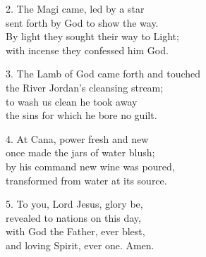 
2. The Magi came, led by a star\\
sent forth by God to show the way.\\
By light they sought their way to Light;\\
with incense they confessed him God.

3. The Lamb of God came forth and touched\\
the River Jordan's cleansing stream;\\
to wash us clean he took away\\
the sins for which he bore no guilt.

4. At Cana, power fresh and new\\
once made the jars of water blush;\\
by his command new wine was poured,\\
transformed from water at its source.

5. To you, Lord Jesus, glory be,\\
revealed to nations on this day,\\
with God the Father, ever blest,\\
and loving Spirit, ever one. Amen.